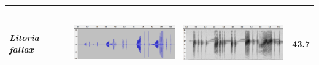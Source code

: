 \begin{table}[htb!]
\begin{tabular}{llll}
\textit{Litoria fallax}      &      \begin{minipage}{.3\textwidth} \includegraphics[width=45mm, height=30mm]{image/Ch1/fallax_wav.png} \end{minipage}   &   \begin{minipage}{.3\textwidth} \includegraphics[width=45mm, height=30mm]{image/Ch1/fallax_spec.png}   \end{minipage}       & 43.7  \\ \hline
\end{tabular}
\end{table}





